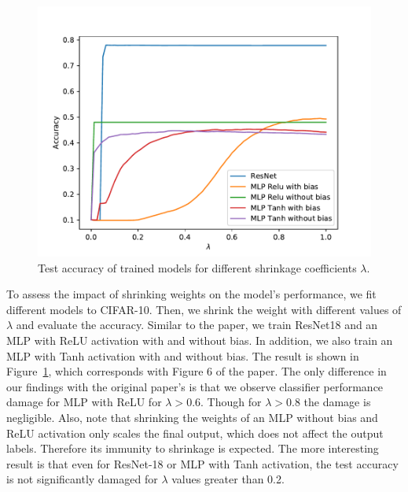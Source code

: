 \begin{figure}
    \centering
    \includegraphics[width=\linewidth]{figures/figure6.pdf}
    \caption{Test accuracy of trained models for different shrinkage coefficients $\lambda$.}
    \label{fig:fig6_shrinkage_accuracy}
\end{figure}

To assess the impact of shrinking weights on the model's performance, we fit different models to CIFAR-10. Then, we shrink the weight with different values of $\lambda$ and evaluate the accuracy. Similar to the paper, we train ResNet18 and an MLP with ReLU activation with and without bias. In addition, we also train an MLP with Tanh activation with and without bias. The result is shown in Figure~\ref{fig:fig6_shrinkage_accuracy}, which corresponds with Figure 6 of the paper. The only difference in our findings with the original paper's is that we observe classifier performance damage for MLP with ReLU for $\lambda > 0.6$. Though for $\lambda > 0.8$ the damage is negligible. Also, note that shrinking the weights of an MLP without bias and ReLU activation only scales the final output, which does not affect the output labels. Therefore its immunity to shrinkage is expected. The more interesting result is that even for ResNet-18 or MLP with Tanh activation, the test accuracy is not significantly damaged for  $\lambda$ values greater than 0.2. 




